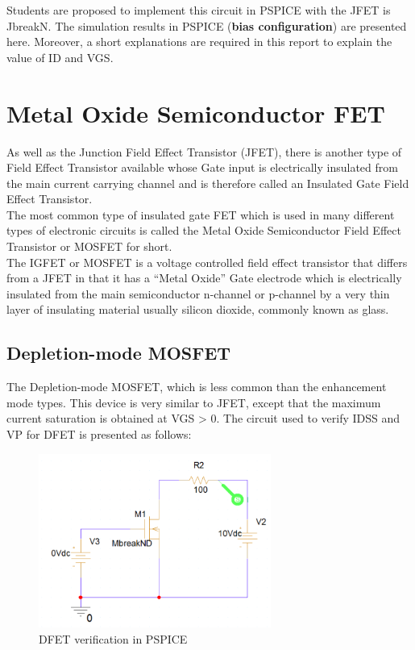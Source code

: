 Students are proposed to implement this circuit in PSPICE with the JFET is JbreakN. The simulation results in PSPICE (\textbf{bias configuration}) are presented here. Moreover, a short explanations are required in this report to explain the value of ID and VGS.

\section{Metal Oxide Semiconductor FET}
As well as the Junction Field Effect Transistor (JFET), there is another type of Field Effect Transistor available whose Gate input is electrically insulated from the main current carrying channel and is therefore called an Insulated Gate Field Effect Transistor.\\

The most common type of insulated gate FET which is used in many different types of electronic circuits is called the Metal Oxide Semiconductor Field Effect Transistor or MOSFET for short.\\

The IGFET or MOSFET is a voltage controlled field effect transistor that differs from a JFET in that it has a “Metal Oxide” Gate electrode which is electrically insulated from the main semiconductor n-channel or p-channel by a very thin layer of insulating material usually silicon dioxide, commonly known as glass.

\subsection{Depletion-mode MOSFET}
The Depletion-mode MOSFET, which is less common than the enhancement mode types. This device is very similar to JFET, except that the maximum current saturation is obtained at VGS > 0.  The circuit used to verify IDSS and VP for DFET is presented as follows:

\begin{figure}[!htp]
    \centering
    \includegraphics[width = 3in]{source/picture/bai_6/dfet1.PNG}
    \caption{DFET verification in PSPICE}
    \label{dfet_1}
\end{figure}

